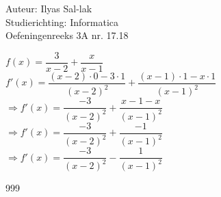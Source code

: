 \documentclass[a4paper]{article}
\begin{document}
\noindent \large Auteur: Ilyas Sal-lak \\
\noindent \large Studierichting: Informatica\\
\noindent \large Oefeningenreeks 3A nr. 17.18\\

\medskip

\normalsize

$f(x) = \dfrac{3}{x - 2} + \dfrac{x}{x - 1}$ \\

$f'(x) = \dfrac{(x - 2) \cdot 0 - 3 \cdot 1}{(x - 2)^2} + \dfrac{(x - 1) \cdot 1 - x \cdot 1}{(x - 1)^2}$ \\

$\Rightarrow f'(x) = \dfrac{-3}{(x - 2)^2} + \dfrac{x - 1 - x}{(x - 1)^2}$ \\

$\Rightarrow f'(x) = \dfrac{-3}{(x - 2)^2} + \dfrac{-1}{(x - 1)^2}$ \\

$\Rightarrow f'(x) = \dfrac{-3}{(x - 2)^2} - \dfrac{1}{(x - 1)^2}$

\begin{thebibliography}{999}
\end{thebibliography}
\end{document}
